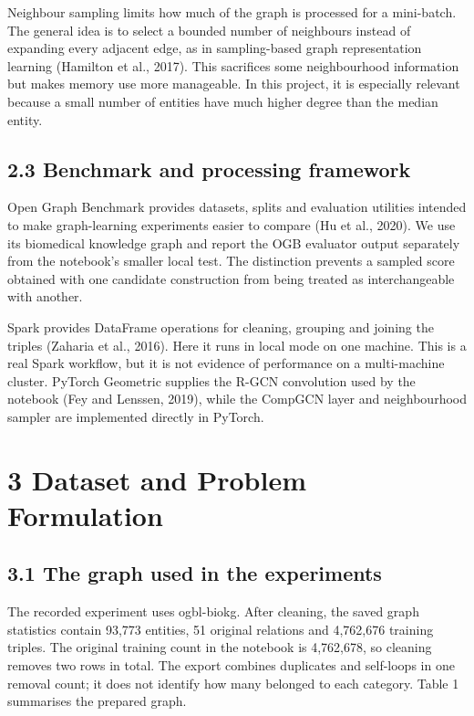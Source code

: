 \documentclass[11pt]{article}
\begin{document}
Neighbour sampling limits how much of the graph is processed for a mini-batch. The general idea is to select a bounded number of neighbours instead of expanding every adjacent edge, as in sampling-based graph representation learning (Hamilton et al., 2017). This sacrifices some neighbourhood information but makes memory use more manageable. In this project, it is especially relevant because a small number of entities have much higher degree than the median entity.

\subsection*{2.3 Benchmark and processing framework}
Open Graph Benchmark provides datasets, splits and evaluation utilities intended to make graph-learning experiments easier to compare (Hu et al., 2020). We use its biomedical knowledge graph and report the OGB evaluator output separately from the notebook's smaller local test. The distinction prevents a sampled score obtained with one candidate construction from being treated as interchangeable with another.

Spark provides DataFrame operations for cleaning, grouping and joining the triples (Zaharia et al., 2016). Here it runs in local mode on one machine. This is a real Spark workflow, but it is not evidence of performance on a multi-machine cluster. PyTorch Geometric supplies the R-GCN convolution used by the notebook (Fey and Lenssen, 2019), while the CompGCN layer and neighbourhood sampler are implemented directly in PyTorch.

\section*{3 Dataset and Problem Formulation}
\subsection*{3.1 The graph used in the experiments}
The recorded experiment uses ogbl-biokg. After cleaning, the saved graph statistics contain 93,773 entities, 51 original relations and 4,762,676 training triples. The original training count in the notebook is 4,762,678, so cleaning removes two rows in total. The export combines duplicates and self-loops in one removal count; it does not identify how many belonged to each category. Table 1 summarises the prepared graph.
\end{document}
